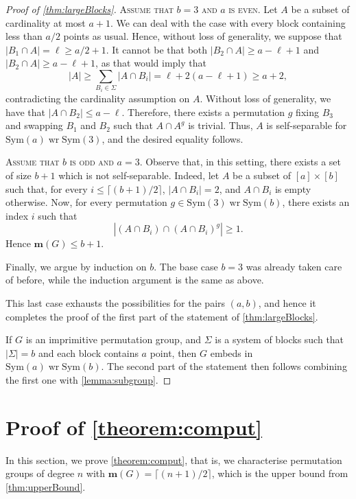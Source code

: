 \documentclass[a4paper]{amsart}
\newcommand{\Sym}{\mathrm{Sym}}
\renewcommand{\wr}{\mathop{\mathrm{wr}}}
\newcommand{\m}{\mathbf{m}}
\theoremstyle{definition}
\begin{document}
\begin{proof}[Proof of \cref{thm:largeBlocks}]
    \smallskip
    \noindent \textsc{Assume that $b=3$ and $a$ is even.} Let $A$ be a subset of cardinality at most $a+1$. We can deal with the case with every block containing less than $a/2$ points as usual. Hence, without loss of generality, we suppose that $\vert B_1\cap A\vert = \ell \geq a/2 +1$. It cannot be that both $\vert B_2\cap A\vert \ge a - \ell +1$ and $\vert B_2\cap A\vert \ge a - \ell +1$, as that would imply that
    \[ |A| \ge \sum_{B_i \in \Sigma} |A \cap B_i| = \ell + 2(a- \ell +1) \ge a+2 , \]
   contradicting the cardinality assumption on $A$. Without loss of generality, we have that $|A \cap B_2| \le a - \ell$. Therefore, there exists a permutation $g$ fixing $B_3$ and swapping $B_1$ and $B_2$ such that $A\cap A^g$ is trivial. Thus, $A$ is self-separable for $\Sym(a) \wr \Sym(3)$, and the desired equality follows.

    
    \smallskip
    \noindent \textsc{Assume that $b$ is odd and $a=3$.}
    Observe that, in this setting, there exists a set of size $b+1$ which is not self-separable. Indeed, let $A$ be a subset of $[a]\times [b]$ such that, for every $i \le \lceil (b+1)/2\rceil$, $|A \cap B_i| = 2$, and $A\cap B_i$ is empty otherwise. Now, for every permutation $g \in \Sym(3) \wr \Sym(b)$, there exists an index $i$ such that
    \[ | (A \cap B_i) \cap (A \cap B_i)^g | \ge 1.  \]
    Hence $\m(G)\le b+1$.
    
    Finally, we argue by induction on $b$. The base case $b=3$ was already taken care of before, while the induction argument is the same as above.
    
    This last case exhausts the possibilities for the pairs $(a,b)$, and hence it completes the proof of the first part of the statement of \cref{thm:largeBlocks}.

    If $G$ is an imprimitive permutation group, and $\Sigma$ is a system of blocks such that $|\Sigma|=b$ and each block contains $a$ point, then $G$ embeds in $\Sym(a) \wr \Sym(b)$. The second part of the statement then follows combining the first one with \cref{lemma:subgroup}.
\end{proof}


\section{Proof of \cref{theorem:comput}} 
\label{sec:upperBound}

In this section, we prove \cref{theorem:comput}, that is, we characterise permutation groups of degree $n$ with $\m(G) = \lceil (n+1)/2\rceil$, which is the upper bound from \cref{thm:upperBound}.
\end{document}
